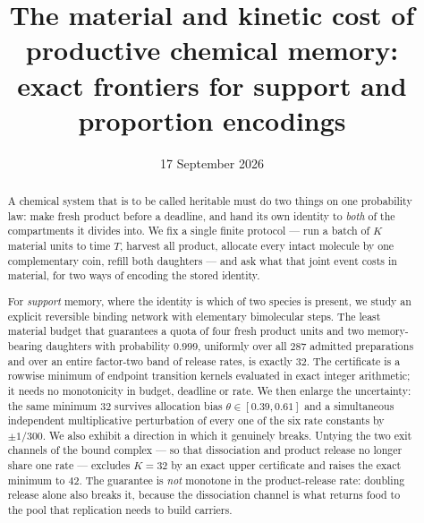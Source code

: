 \documentclass[11pt]{article}
\title{\bfseries The material and kinetic cost of productive chemical memory:\\
exact frontiers for support and proportion encodings}
\author{}
\date{17 September 2026}
\theoremstyle{plain}
\theoremstyle{definition}
\theoremstyle{remark}
\begin{document}
\maketitle

\begin{abstract}
A chemical system that is to be called heritable must do two things on one
probability law: make fresh product before a deadline, and hand its own
identity to \emph{both} of the compartments it divides into. We fix a single
finite protocol --- run a batch of $K$ material units to time $T$, harvest all
product, allocate every intact molecule by one complementary coin, refill both
daughters --- and ask what that joint event costs in material, for two ways of
encoding the stored identity.

For \emph{support} memory, where the identity is which of two species is
present, we study an explicit reversible binding network with elementary
bimolecular steps. The least material budget that guarantees a quota of four
fresh product units and two memory-bearing daughters with probability
$0.999$, uniformly over all $287$ admitted preparations and over an entire
factor-two band of release rates, is exactly $32$. The certificate is a
rowwise minimum of endpoint transition kernels evaluated in exact integer
arithmetic; it needs no monotonicity in budget, deadline or rate. We then
enlarge the uncertainty: the same minimum $32$ survives allocation bias
$\theta\in[0.39,0.61]$ and a simultaneous independent multiplicative
perturbation of every one of the six rate constants by $\pm1/300$. We also
exhibit a direction in which it genuinely breaks. Untying the two exit
channels of the bound complex --- so that dissociation and product release no
longer share one rate --- excludes $K=32$ by an exact upper certificate and
raises the exact minimum to $42$. The guarantee is \emph{not} monotone in the
product-release rate: doubling release alone also breaks it, because the
dissociation channel is what returns food to the pool that replication needs
to build carriers.


\end{abstract}
\end{document}
